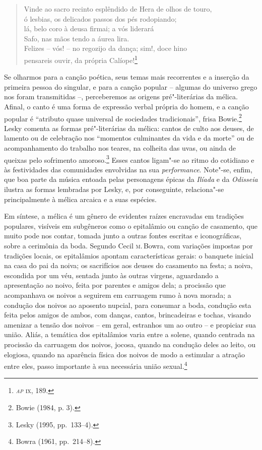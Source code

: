 \begin{verse}
\small{Vinde ao sacro recinto esplêndido de Hera de olhos de touro,\\
\hspace*{4.5em} ó lesbias, os delicados passos dos pés rodopiando;\\
lá, belo coro à deusa firmai; a vós liderará\\
\hspace*{4.5em} Safo, nas mãos tendo a áurea lira.\\
Felizes -- vós! -- no regozijo da dança; sim!, doce hino\\
\hspace*{4.5em} pensareis ouvir, da própria Calíope!}\footnote{\textit{\textsc{ap}} \textsc{ix}, 189.}
\end{verse}

Se olharmos para a canção poética, seus temas mais recorrentes e a inserção da
primeira pessoa do singular, e para a canção popular -- algumas do universo grego nos
foram transmitidas --, perceberemos as origens pré"-literárias da mélica. Afinal,
o canto é uma forma de expressão verbal própria do homem, e a canção popular é
“atributo quase universal de sociedades tradicionais”, frisa Bowie.\footnote{
Bowie (1984, p. 3).} Lesky comenta as formas
pré"-literárias da mélica: cantos de culto aos deuses, de lamento ou de celebração
nos “momentos culminantes da vida e da morte” ou de acompanhamento do trabalho nos teares, na colheita das uvas, ou ainda de queixas pelo sofrimento amoroso.\footnote{ Lesky (1995, pp.~133--4).} Esses cantos ligam"-se ao ritmo do
cotidiano e às festividades das comunidades envolvidas na sua
\textit{performance}. Note"-se, enfim, que boa parte da música entoada pelas
personagens épicas da \textit{Ilíada} e da \textit{Odisseia} ilustra as formas
lembradas por Lesky, e, por conseguinte, relaciona"-se principalmente à mélica
arcaica e a suas espécies.

Em síntese, a mélica é um gênero de evidentes raízes
encravadas em tradições populares, visíveis em subgêneros
como o epitalâmio ou canção de casamento, que muito pode nos contar, tomada
junto a outras fontes escritas e iconográficas, sobre a cerimônia
da boda. Segundo Cecil \textsc{m}.\,Bowra, com variações
impostas por tradições locais, os epitalâmios apontam características gerais:
o banquete inicial na casa do pai da noiva; os sacrifícios aos
deuses do casamento na festa; a noiva, escondida por um véu, sentada junto às
outras virgens, aguardando a apresentação ao noivo, feita por parentes e amigos
dela; a procissão que acompanhava os noivos a seguirem em carruagem rumo à nova
morada; a condução dos noivos ao aposento nupcial, para consumar a boda,
condução esta feita pelos amigos de ambos, com danças, cantos, brincadeiras e
tochas, visando amenizar a tensão dos noivos -- em geral, estranhos um ao outro
-- e propiciar sua união. Aliás, a temática dos epitalâmios varia entre a
solene, quando centrada na procissão da carruagem dos noivos, jocosa, quando na
condução deles ao leito, ou elogiosa, quando na aparência física dos noivos de
modo a estimular a atração entre eles, passo importante à sua necessária união
sexual.\footnote{ Bowra (1961, pp.~214--8).}

